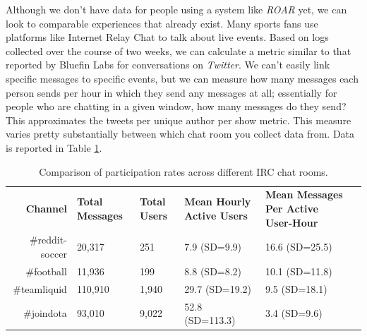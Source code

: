 
Although we don't have data for people using a system like \emph{ROAR} yet, we can look to comparable experiences that already exist. Many sports fans use platforms like Internet Relay Chat to talk about live events. Based on logs collected over the course of two weeks, we can calculate a metric similar to that reported by Bluefin Labs for conversations on \emph{Twitter}. We can't easily link specific messages to specific events, but we can measure how many messages each person sends per hour in which they send any messages at all; essentially for people who are chatting in a given window, how many messages do they send? This approximates the tweets per unique author per show metric. This measure varies pretty substantially between which chat room you collect data from. Data is reported in Table \ref{tab:chat_message_rates}. 



\begin{table}[tb]
\begin{tabular}{r|lllll}
\textbf{Channel} & \textbf{Total Messages} & \textbf{Total Users} & \textbf{Mean Hourly Active Users} & \textbf{Mean  Messages Per Active User-Hour} \\

\#reddit-soccer & 20,317 & 251 & 7.9 (SD=9.9) & 16.6 (SD=25.5) \\
\#football & 11,936 & 199 & 8.8 (SD=8.2) & 10.1 (SD=11.8) \\
\#teamliquid & 110,910 & 1,940 & 29.7 (SD=19.2) & 9.5 (SD=18.1) \\
\#joindota & 93,010 & 9,022 & 52.8 (SD=113.3) & 3.4 (SD=9.6) \\
	
\end{tabular}
\label{tab:chat_message_rates}
\caption{Comparison of participation rates across different IRC chat rooms.}
\end{table}

